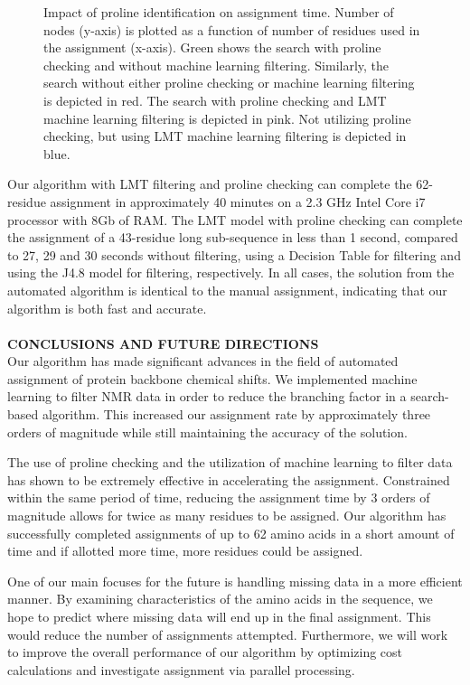 \documentclass{article}
\begin{document}
\begin{figure}[H]
	\begin{center}
		\resizebox{!}{0.6\textwidth}{}
	\caption{Impact of proline identification on assignment time. Number of nodes (y-axis) is plotted as a function of number of residues used in the assignment (x-axis). Green shows the search with proline checking and without machine learning filtering. Similarly, the search without either proline checking or machine learning filtering is depicted in red. The search with proline checking and LMT machine learning filtering is depicted in pink. Not utilizing proline checking, but using LMT machine learning filtering is depicted in blue.}
	\label{fig:figure2}
	\end{center}
\end{figure}

\indent Our algorithm with LMT filtering and proline checking can complete the 62-residue assignment in approximately 40 minutes on a 2.3 GHz Intel Core i7 processor with 8Gb of RAM. The LMT model with proline checking can complete the assignment of a 43-residue long sub-sequence in less than 1 second, compared to 27, 29 and 30 seconds without filtering, using a Decision Table for filtering and using the J4.8 model for filtering, respectively. In all cases, the solution from the automated algorithm is identical to the manual assignment, indicating that our algorithm is both fast and accurate. 
\\\\
\noindent\textbf {CONCLUSIONS AND FUTURE DIRECTIONS}\\
\indent Our algorithm has made significant advances in the field of automated assignment of protein backbone chemical shifts. We implemented machine learning to filter NMR data in order to reduce the branching factor in a search-based algorithm. This increased our assignment rate by approximately three orders of magnitude while still maintaining the accuracy of the solution.

\indent The use of proline checking and the utilization of machine learning to filter data has shown to be extremely effective in accelerating the assignment. Constrained within the same period of time, reducing the assignment time by 3 orders of magnitude allows for twice as many residues to be assigned. Our algorithm has successfully completed assignments of up to 62 amino acids in a short amount of time and if allotted more time, more residues could be assigned.

\indent One of our main focuses for the future is handling missing data in a more efficient manner. By examining characteristics of the amino acids in the sequence, we hope to predict where missing data will end up in the final assignment. This would reduce the number of assignments attempted. Furthermore, we will work to improve the overall performance of our algorithm by optimizing cost calculations and investigate assignment via parallel processing.
\end{document}
